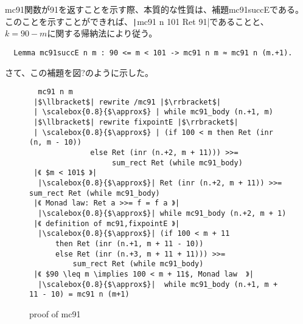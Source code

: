 \documentclass[japanese]{jssst_ppl}
\theoremstyle{definition}
\begin{document}
mc91関数が91を返すことを示す際、本質的な性質は、補題mc91succEである。
このことを示すことができれば、\texttt|mc91 n 101 \approx Ret 91|であることと、
$ k =  90 - m $に関する帰納法により従う。



\begin{verbatim}
  Lemma mc91succE n m : 90 <= m < 101 -> mc91 n m ≈ mc91 n (m.+1).
\end{verbatim}

さて、この補題を図?のように示した。




\begin{figure}
  \centering

  \begin{verbatim}
  mc91 n m
 |$\llbracket$| rewrite /mc91 |$\rrbracket$|
 | \scalebox{0.8}{$\approx$} | while mc91_body (n.+1, m)
 |$\llbracket$| rewrite fixpointE |$\rrbracket$|
 | \scalebox{0.8}{$\approx$} | (if 100 < m then Ret (inr (n, m - 10))
              else Ret (inr (n.+2, m + 11))) >>=
                   sum_rect Ret (while mc91_body)
 |《 $m < 101$ 》|
  |\scalebox{0.8}{$\approx$}| Ret (inr (n.+2, m + 11)) >>= sum_rect Ret (while mc91_body)
 |《 Monad law: Ret a >>= f = f a 》|
  |\scalebox{0.8}{$\approx$}| while mc91_body (n.+2, m + 1)
 |《 definition of mc91,fixpointE 》|
  |\scalebox{0.8}{$\approx$}| (if 100 < m + 11
      then Ret (inr (n.+1, m + 11 - 10))
      else Ret (inr (n.+3, m + 11 + 11))) >>=
          sum_rect Ret (while mc91_body)
 |《 $90 \leq m \implies 100 < m + 11$, Monad law  》|
  |\scalebox{0.8}{$\approx$}|  while mc91_body (n.+1, m + 11 - 10) = mc91 n (m+1)

    \end{verbatim}


  \caption{proof of mc91 }
\end{figure}
\end{document}
